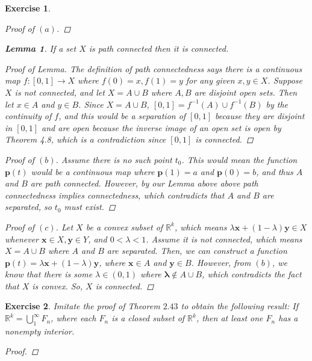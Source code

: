 \documentclass[10pt,letterpaper]{amsart}
\newtheorem{exercise}{Exercise}[section]
\theoremstyle{definition}
\newtheorem*{lemma}{Lemma}
\theoremstyle{remark}
\numberwithin{equation}{exercise}
\begin{document}
\begin{multicols}{2}
\begin{exercise}
\begin{proof}[Proof of $(a)$]
    \end{proof}
    \begin{lemma}
      If a set $X$ is path connected then it is connected.
    \end{lemma}
    \begin{proof}[Proof of Lemma]
      The definition of path connectedness says there is a continuous map $f:[0,1] \rightarrow X$ where $f(0) = x, f(1) = y$ for any given $x,y \in X$. Suppose $X$ is not connected, and let $X = A \cup B$ where $A, B$ are disjoint open sets. Then let $x \in A$ and $y \in B$. Since $X = A \cup B$, $[0,1] = f^{-1}(A) \cup f^{-1}(B)$ by the continuity of $f$, and this would be a separation of $[0,1]$ because they are disjoint in $[0,1]$ and are open because the inverse image of an open set is open by Theorem 4.8, which is a contradiction since $[0,1]$ is connected.
    \end{proof}
    \begin{proof}[Proof of $(b)$]
      Assume there is no such point $t_0$. This would mean the function $\mathbf{p}(t)$ would be a continuous map where $\mathbf{p}(1) = a$ and $\mathbf{p}(0) = b$, and thus $A$ and $B$ are path connected. However, by our Lemma above above path connectedness implies connectedness, which contradicts that $A$ and $B$ are separated, so $t_0$ must exist.
    \end{proof}
    \begin{proof}[Proof of $(c)$]
      Let $X$ be a convex subset of $\mathbb{R}^k$, which means $\lambda \mathbf{x} + (1 - \lambda) \mathbf{y} \in X$ whenever $\mathbf{x} \in X, \mathbf{y} \in Y$, and $0 < \lambda < 1$. Assume it is not connected, which means $X = A \cup B$ where $A$ and $B$ are separated. Then, we can construct a function $\mathbf{p}(t) = \lambda \mathbf{x} + (1 - \lambda) \mathbf{y}$, where $\mathbf{x} \in A$ and $\mathbf{y} \in B$. However, from $(b)$, we know that there is some $\lambda \in (0,1)$ where $\mathbf{\lambda} \notin A \cup B$, which contradicts the fact that $X$ is convex. So, $X$ is connected.
    \end{proof}
  \end{exercise}
  \setcounter{exercise}{29}
  \begin{exercise}\label{2.30}
    Imitate the proof of Theorem $2.43$ to obtain the following result: If $\mathbb{R}^k = \bigcup_1^\infty F_n$, where each $F_n$ is a closed subset of $\mathbb{R}^k$, then at least one $F_n$ has a nonempty interior.
    \begin{proof}

\end{proof}
\end{exercise}
\end{multicols}
\end{document}
